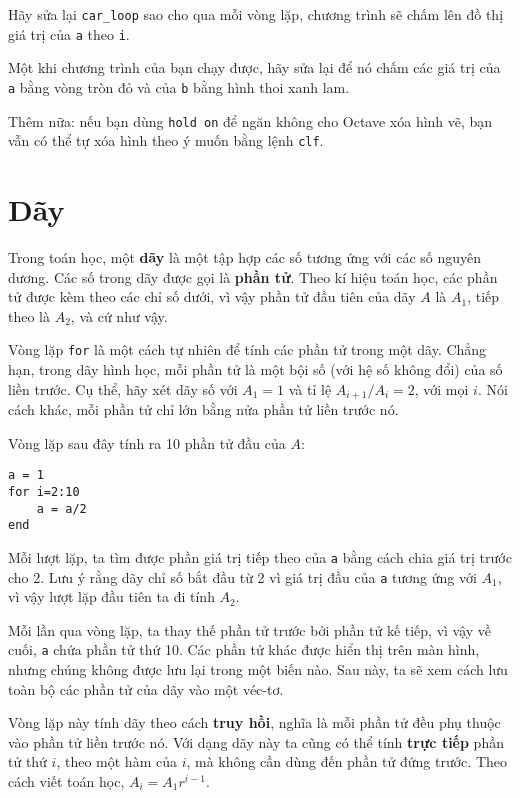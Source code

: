 \documentclass[12pt]{book}
\begin{document}
\begin{ex}
Hãy sửa lại \verb#car_loop# sao cho qua mỗi vòng lặp, chương trình
sẽ chấm lên đồ thị giá trị của {\tt a} theo {\tt i}.

Một khi chương trình của bạn chạy được, hãy sửa lại để nó chấm
các giá trị của {\tt a} bằng vòng tròn đỏ và của {\tt b} bằng 
hình thoi xanh lam.

Thêm nữa: nếu bạn dùng {\tt hold on} để ngăn không cho Octave 
xóa hình vẽ, bạn vẫn có thể tự xóa hình theo ý muốn bằng lệnh
{\tt clf}.
\end{ex}


\section{Dãy}

Trong toán học, một {\bf dãy} là một tập hợp các số tương ứng với
các số nguyên dương. Các số trong dãy được gọi là 
{\bf phần tử}. Theo kí hiệu toán học, các phần tử được kèm theo 
các chỉ số dưới, vì vậy phần tử đầu tiên của dãy $A$ là $A_1$,
tiếp theo là $A_2$, và cứ như vậy.

Vòng lặp {\tt for} là một cách tự nhiên để tính các phần tử trong một
dãy. Chẳng hạn, trong dãy hình học, mỗi phần tử là một bội số (với
hệ số không đổi) của số liền trước. Cụ thể, hãy xét dãy số với 
$A_1 = 1$ và tỉ lệ $A_{i+1} / A_i = 2$, với mọi $i$. Nói cách khác,
mỗi phần tử chỉ lớn bằng nửa phần tử liền trước nó.

Vòng lặp sau đây tính ra 10 phần tử đầu của $A$:

\begin{verbatim}
a = 1
for i=2:10
    a = a/2
end
\end{verbatim}
%
Mỗi lượt lặp, ta tìm được phần giá trị tiếp theo của {\tt a}
bằng cách chia giá trị trước cho 2. Lưu ý rằng dãy chỉ số bắt
đầu từ 2 vì giá trị đầu của {\tt a} tương ứng với $A_1$, vì vậy
lượt lặp đầu tiên ta đi tính $A_2$.

Mỗi lần qua vòng lặp, ta thay thế phần tử trước bởi phần tử
kế tiếp, vì vậy về cuối, {\tt a} chứa phần tử thứ 10. Các phần tử
khác được hiển thị trên màn hình, nhưng chúng không được lưu
lại trong một biến nào. Sau này, ta sẽ xem cách lưu toàn bộ các
phần tử của dãy vào một véc-tơ.

Vòng lặp này tính dãy theo cách {\bf truy hồi}, nghĩa là mỗi phần tử
đều phụ thuộc vào phần tử liền trước nó. Với dạng dãy này ta cũng
có thể tính {\bf trực tiếp} phần tử thứ $i$, theo một hàm của $i$,
mà không cần dùng đến phần tử đứng trước. Theo cách viết
toán học, $A_i = A_1 r^{i-1}$.  
\end{document}
